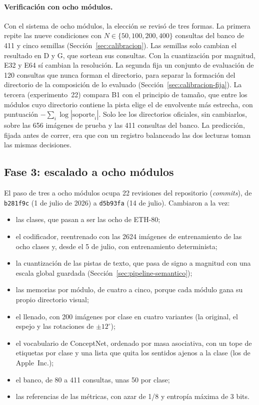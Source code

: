 \paragraph{Verificación con ocho módulos.}
Con el sistema de ocho módulos, la elección se revisó de tres formas.
La primera repite las nueve condiciones con $N \in \{50, 100, 200, 400\}$ consultas del
banco de 411 y cinco semillas (Sección~\ref{sec:calibracion}).
Las semillas solo cambian el resultado en D y G, que sortean sus consultas.
Con la cuantización por magnitud, E32 y E64 sí cambian la resolución.
La segunda fija un conjunto de evaluación de 120 consultas que nunca forman el
directorio, para separar la formación del directorio de la composición de lo evaluado
(Sección~\ref{sec:calibracion-fija}).
La tercera (experimento~22) compara B1 con el principio de tamaño, que entre los
módulos cuyo directorio contiene la pista elige el de envolvente más estrecha, con
puntuación $-\sum_i \log|\mathrm{soporte}_i|$.
Solo lee los directorios oficiales, sin cambiarlos, sobre las 656 imágenes de prueba y
las 411 consultas del banco.
La predicción, fijada antes de correr, era que con un registro balanceado las dos
lecturas toman las mismas decisiones.

\subsection{Fase 3: escalado a ocho módulos}
\label{fase3:escalado}

El paso de tres a ocho módulos ocupa 22 revisiones del repositorio (\textit{commits}), de \texttt{b281f9c} (1 de julio de
2026) a \texttt{d5b93fa} (14 de julio).
Cambiaron a la vez:
\begin{itemize}
    \item las clases, que pasan a ser las ocho de ETH-80;
    \item el codificador, reentrenado con las 2624 imágenes de entrenamiento de las ocho
    clases y, desde el 5 de julio, con entrenamiento determinista;
    \item la cuantización de las pistas de texto, que pasa de signo a magnitud con una
    escala global guardada (Sección~\ref{sec:pipeline-semantico});
    \item las memorias por módulo, de cuatro a cinco, porque cada módulo gana su propio
    directorio visual;
    \item el llenado, con 200 imágenes por clase en cuatro variantes (la original, el
    espejo y las rotaciones de $\pm 12^{\circ}$);
    \item el vocabulario de ConceptNet, ordenado por masa asociativa, con un tope de
    etiquetas por clase y una lista que quita los sentidos ajenos a la clase (los de
    Apple~Inc.);
    \item el banco, de 80 a 411 consultas, unas 50 por clase;
    \item las referencias de las métricas, con azar de 1/8 y entropía máxima de 3 bits.
\end{itemize}

